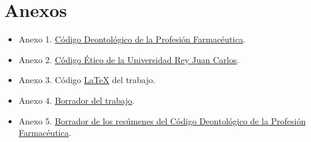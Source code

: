 \documentclass[11pt,a4paper]{article}
\begin{document}
\section{Anexos}
\begin{itemize}[label = {}]
	\item Anexo 1. \href{https://www.portalfarma.com/Profesionales/organizacionfcolegial/portal-transparencia/Documents/2018-Codigo-Deontologia-Profesion-Farmaceutica-CGCOF.pdf}{Código Deontológico de la Profesión Farmacéutica}.
	\item Anexo 2. \href{https://www.urjc.es/codigoetico}{Código Ético de la Universidad Rey Juan Carlos}.
\item Anexo 3. Código \href{https://github.com/Denis-urjc/PJtrabajo}{\LaTeX} del trabajo.
\item Anexo 4. \href{https://docs.google.com/document/d/1JPIhGiP2SUPTwZ42QgbEhY5bHKPIPoN0i3u79ej2DwQ/edit#heading=h.zf8tz9rpog2d}{Borrador del trabajo}.
\item Anexo 5. \href{https://docs.google.com/document/d/1jByW4G1lbvmoq82MXhN4lJDx3bpDZP1n1jSouQVpACU/edit#heading=h.ocedmy22huli}{Borrador de los resúmenes del Código Deontológico de la Profesión Farmacéutica}.
\end{itemize}
\end{document}
